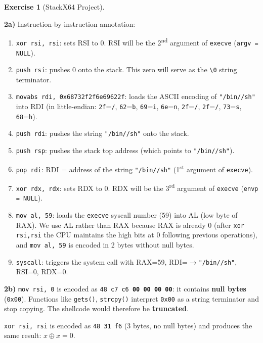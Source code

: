 \documentclass[a4paper,11pt]{article}
\theoremstyle{plain}
\theoremstyle{definition}
\newtheorem{exercice}{Exercise}
\begin{document}
\begin{exercice}[StackX64 Project]
\begin{correction}

\textbf{2a)} Instruction-by-instruction annotation:
\begin{enumerate}
    \item \texttt{xor rsi, rsi}: sets RSI to 0. RSI will be the 2\textsuperscript{nd} argument of \texttt{execve} (\texttt{argv = NULL}).
    \item \texttt{push rsi}: pushes 0 onto the stack. This zero will serve as the \texttt{\textbackslash 0} string terminator.
    \item \texttt{movabs rdi, 0x68732f2f6e69622f}: loads the ASCII encoding of \texttt{"/bin//sh"} into RDI (in little-endian: \texttt{2f}=\texttt{/}, \texttt{62}=\texttt{b}, \texttt{69}=\texttt{i}, \texttt{6e}=\texttt{n}, \texttt{2f}=\texttt{/}, \texttt{2f}=\texttt{/}, \texttt{73}=\texttt{s}, \texttt{68}=\texttt{h}).
    \item \texttt{push rdi}: pushes the string \texttt{"/bin//sh"} onto the stack.
    \item \texttt{push rsp}: pushes the stack top address (which points to \texttt{"/bin//sh"}).
    \item \texttt{pop rdi}: RDI = address of the string \texttt{"/bin//sh"} (1\textsuperscript{st} argument of \texttt{execve}).
    \item \texttt{xor rdx, rdx}: sets RDX to 0. RDX will be the 3\textsuperscript{rd} argument of \texttt{execve} (\texttt{envp = NULL}).
    \item \texttt{mov al, 59}: loads the \texttt{execve} syscall number (59) into AL (low byte of RAX). We use AL rather than RAX because RAX is already 0 (after \texttt{xor rsi,rsi} the CPU maintains the high bits at 0 following previous operations), and \texttt{mov al, 59} is encoded in 2 bytes without null bytes.
    \item \texttt{syscall}: triggers the system call with RAX=59, RDI=$\to$\texttt{"/bin//sh"}, RSI=0, RDX=0.
\end{enumerate}

\textbf{2b)} \texttt{mov rsi, 0} is encoded as \texttt{48 c7 c6 \textbf{00 00 00 00}}: it contains \textbf{null bytes} (\texttt{0x00}). Functions like \texttt{gets()}, \texttt{strcpy()} interpret \texttt{0x00} as a string terminator and stop copying. The shellcode would therefore be \textbf{truncated}.

\texttt{xor rsi, rsi} is encoded as \texttt{48 31 f6} (3 bytes, no null bytes) and produces the same result: $x \oplus x = 0$.


\end{correction}
\end{exercice}
\end{document}
